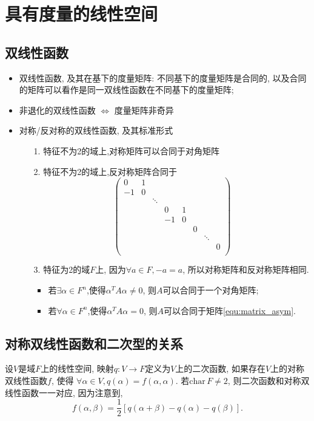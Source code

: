 \section{具有度量的线性空间}
\subsection{双线性函数}
\begin{itemize}
    \item 双线性函数, 及其在基下的度量矩阵: 不同基下的度量矩阵是合同的,
    以及合同的矩阵可以看作是同一双线性函数在不同基下的度量矩阵;
    \item 非退化的双线性函数 $\Longleftrightarrow$ 度量矩阵非奇异
    \item 对称/反对称的双线性函数, 及其标准形式
    \begin{itemize}
        \item[1.] 特征不为2的域上,对称矩阵可以合同于对角矩阵
        \item[2.] 特征不为2的域上,反对称矩阵合同于
        \begin{equation}
        \begin{pmatrix}
        0&1\\
        -1&0\\
        &&\ddots\\
        &&&0&1\\
        &&&-1&0\\
        &&&&&0\\
        &&&&&&\ddots\\
        &&&&&&&0\\
        \end{pmatrix}
        \label{equ:matrix_asym}
        \end{equation}
        \item[3.] 特征为2的域$F$上, 因为$\forall a\in F, -a=a$, 
        所以对称矩阵和反对称矩阵相同.
        \begin{itemize}
            \item 若$\exists \alpha \in F^n$,使得$\alpha^T A \alpha \ne 0$,
                  则$A$可以合同于一个对角矩阵;
            \item 若$\forall \alpha \in F^n$,使得$\alpha^T A \alpha = 0$,
                  则$A$可以合同于矩阵\ref{equ:matrix_asym}.
        \end{itemize}
    \end{itemize}
\end{itemize}

\subsection{对称双线性函数和二次型的关系}
设$V$是域$F$上的线性空间, 映射$q: V\rightarrow F$定义为$V$上的二次函数,
如果存在$V$上的对称双线性函数$f$, 使得
$\forall \alpha \in V,q(\alpha) = f(\alpha, \alpha)$.
若$\mathrm{char}\,F \ne 2$,
则二次函数和对称双线性函数一一对应, 因为注意到,
\begin{equation}
\nonumber
f(\alpha, \beta) = 
\frac{1}{2}[q(\alpha+\beta) - q(\alpha) - q(\beta)].
\end{equation}

